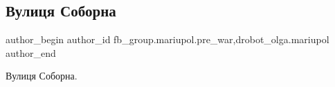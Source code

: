  
 
 
 
 

\subsection{Вулиця Соборна}
\label{sec:03_02_2023.fb.fb_group.mariupol.pre_war.1.vulitsya_soborna}
 
\ifcmt
 author_begin
   author_id fb_group.mariupol.pre_war,drobot_olga.mariupol
 author_end
\fi

Вулиця Соборна.
